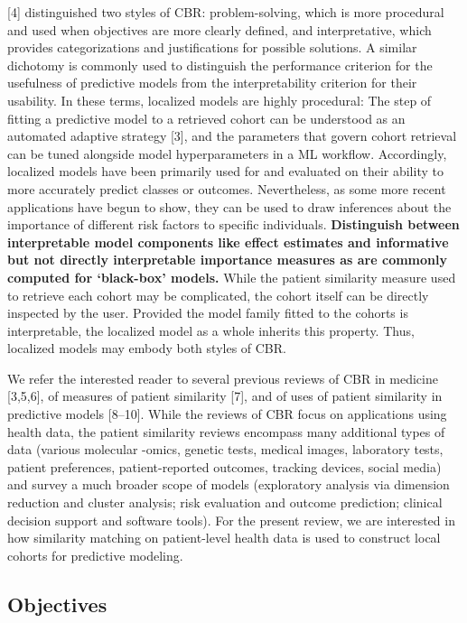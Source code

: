 \documentclass[preprint, 3p,
authoryear]{elsarticle} %
\begin{document}
{[}4{]} distinguished two styles of CBR: problem-solving, which is more
procedural and used when objectives are more clearly defined, and
interpretative, which provides categorizations and justifications for
possible solutions. A similar dichotomy is commonly used to distinguish
the performance criterion for the usefulness of predictive models from
the interpretability criterion for their usability. In these terms,
localized models are highly procedural: The step of fitting a predictive
model to a retrieved cohort can be understood as an automated adaptive
strategy {[}3{]}, and the parameters that govern cohort retrieval can be
tuned alongside model hyperparameters in a ML workflow. Accordingly,
localized models have been primarily used for and evaluated on their
ability to more accurately predict classes or outcomes. Nevertheless, as
some more recent applications have begun to show, they can be used to
draw inferences about the importance of different risk factors to
specific individuals. \textbf{Distinguish between interpretable model
components like effect estimates and informative but not directly
interpretable importance measures as are commonly computed for
`black-box' models.} While the patient similarity measure used to
retrieve each cohort may be complicated, the cohort itself can be
directly inspected by the user. Provided the model family fitted to the
cohorts is interpretable, the localized model as a whole inherits this
property. Thus, localized models may embody both styles of CBR.

We refer the interested reader to several previous reviews of CBR in
medicine {[}3,5,6{]}, of measures of patient similarity {[}7{]}, and of
uses of patient similarity in predictive models {[}8--10{]}. While the
reviews of CBR focus on applications using health data, the patient
similarity reviews encompass many additional types of data (various
molecular -omics, genetic tests, medical images, laboratory tests,
patient preferences, patient-reported outcomes, tracking devices, social
media) and survey a much broader scope of models (exploratory analysis
via dimension reduction and cluster analysis; risk evaluation and
outcome prediction; clinical decision support and software tools). For
the present review, we are interested in how similarity matching on
patient-level health data is used to construct local cohorts for
predictive modeling.

\hypertarget{objectives}{%
\subsection{Objectives}\label{objectives}}
\end{document}
